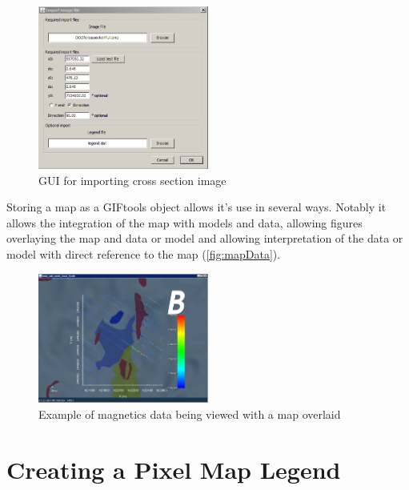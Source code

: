 \begin{figure} [h]
    \centering
    \includegraphics[width=0.5\textwidth]{images/GUI/importCross.PNG}
    \caption{GUI for importing cross section image }
    \label{fig:importCrossGui}
\end{figure}
Storing a map as a GIFtools object allows it's use in several ways. Notably it allows the integration of the map with models and data, allowing figures overlaying the map and data or model and allowing interpretation of the data or model with direct reference to the map (\autoref{fig:mapData}).
\begin{figure} [h]
    \centering
    \includegraphics[width=0.5\textwidth]{images/GUI/mapData.PNG}
    \caption{Example of magnetics data being viewed with a map overlaid }
    \label{fig:mapData}
\end{figure}



\section{Creating a Pixel Map Legend}
\label{sec:Create Pixel Map Legend}

